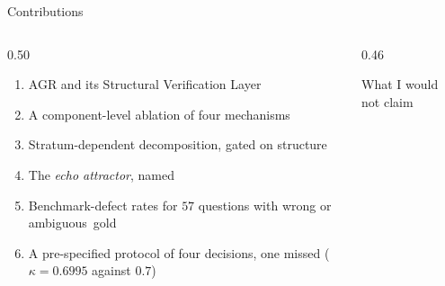\begin{frame}{Contributions}
  \bodyshift{-3.25pt}
  \begin{columns}[T]
    \begin{column}{0.50\textwidth}
      \small\let\raggedright\agrraggedright
      \begin{enumerate}\setlength{\itemsep}{0pt}
        \item AGR and its \alert{Structural Verification Layer}
        \item A \alert{component-level ablation} of four mechanisms
        \item \alert{Stratum-dependent decomposition}, gated on structure
        \item The \emph{\alert{echo attractor}}, named
        \item \alert{Benchmark-defect rates} for $57$ questions with wrong
          or \mbox{ambiguous gold}
        \item A \alert{pre-specified} protocol of four decisions, one
          missed ($\kappa = 0.6995$ against $0.7$)
      \end{enumerate}
    \end{column}
    \begin{column}{0.46\textwidth}
      \begin{block}{What I would not claim}

\end{block}
\end{column}
\end{columns}
\end{frame}
